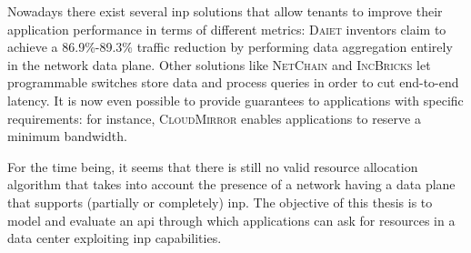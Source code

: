 Nowadays there exist several \gls{inp} solutions that allow tenants to improve their application performance in terms of different metrics: \textsc{Daiet} \cite{daiet} inventors claim to achieve a 86.9\%-89.3\% traffic reduction by performing data aggregation entirely in the network data plane.
Other solutions like \textsc{NetChain} \cite{netchain} and \textsc{IncBricks} \cite{incbricks} let programmable switches store data and process queries in order to cut end-to-end latency.
It is now even possible to provide guarantees to applications with specific requirements: for instance, \textsc{CloudMirror} \cite{cloudmirror} enables applications to reserve a minimum bandwidth.\par
For the time being, it seems that there is still no valid resource allocation algorithm that takes into account the presence of a network having a data plane that supports (partially or completely) \gls{inp}.
The objective of this thesis is to model and evaluate an \gls{api} through which applications can ask for resources in a data center exploiting \gls{inp} capabilities. %